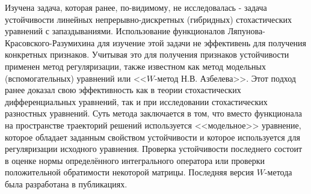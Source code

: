 Изучена задача, которая ранее, по-видимому, не исследовалась -
задача устойчивости линейных непрерывно-дискретных (гибридных)
стохастических уравнений с запаздываниями. Использование
функционалов Ляпунова-Красовского-Разумихина для изучение этой
задачи не эффективень  для получения конкретных признаков. Учитывая
это для получения признаков устойчивости применен метод
регуляризации, также известном как метод модельных (вспомогательных)
уравнений или <<$W$-метод Н.В. Азбелева>>. Этот подход ранее доказал
свою эффективность как в теории стохастических дифференциальных
уравнений, так и при исследовании стохастических разностных
уравнений. Суть метода заключается в том, что вместо функционала на
пространстве траекторий решений используется <<модельное>>
уравнение, которое обладает заданным свойством устойчивости и
которое используется для регуляризации исходного уравнения. Проверка
устойчивости последнего состоит в оценке нормы определённого
интегрального оператора или проверки положительной обратимости
некоторой матрицы. Последняя версия $W$-метода была разработана в
публикациях.